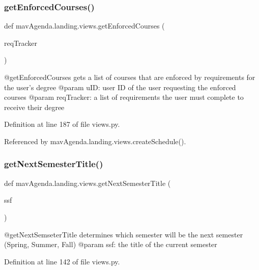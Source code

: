 \subsubsection{\texorpdfstring{get\+Enforced\+Courses()}{getEnforcedCourses()}}
{\footnotesize\ttfamily def mav\+Agenda.\+landing.\+views.\+get\+Enforced\+Courses (\begin{DoxyParamCaption}\item[{}]{req\+Tracker }\end{DoxyParamCaption})}

\begin{DoxyVerb}@getEnforcedCourses gets a list of courses that are enforced by requirements for the user's degree
@param uID: user ID of the user requesting the enforced courses
@param reqTracker: a list of requirements the user must complete to receive their degree
\end{DoxyVerb}
 

Definition at line 187 of file views.\+py.



Referenced by mav\+Agenda.\+landing.\+views.\+create\+Schedule().

\mbox{\label{namespacemavAgenda_1_1landing_1_1views_a1715b2bbbb2491f5c6171b58c0f1b013}} 
\subsubsection{\texorpdfstring{get\+Next\+Semester\+Title()}{getNextSemesterTitle()}}
{\footnotesize\ttfamily def mav\+Agenda.\+landing.\+views.\+get\+Next\+Semester\+Title (\begin{DoxyParamCaption}\item[{}]{ssf }\end{DoxyParamCaption})}

\begin{DoxyVerb}@getNextSemseterTitle determines which semester will be the next semester (Spring, Summer, Fall)
@param ssf: the title of the current semester
\end{DoxyVerb}
 

Definition at line 142 of file views.\+py.




